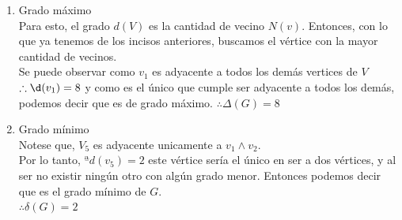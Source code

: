 \documentclass{article}
\begin{document}
\begin{justify}
{\begin{enumerate}
      \item Grado máximo \\
        Para esto, el grado $d(V) $ es la cantidad de vecino $N(v)$. Entonces, con lo que ya tenemos de los incisos anteriores, buscamos el vértice con la mayor cantidad de vecinos.\\
        Se puede observar como $v_1$ es adyacente a todos los demás vertices de $V$\\
        $\therefore  \d(v_1) = 8$ y como es el único que cumple ser adyacente a todos los demás, podemos decir que es de grado máximo.
        $\therefore \Delta(G) = 8$
      \item Grado mínimo \\
        Notese que, $V_5$ es adyacente unicamente a $v_1 \land v_2 $. \\
        Por lo tanto, $ªd(v_5) = 2$ este vértice sería el único en ser a dos vértices, y al ser no existir ningún otro con algún grado menor.
        Entonces podemos decir que es el grado mínimo de $G$.\\
        $\therefore \delta(G) = 2$
      \end{enumerate}
      }
\end{justify}
\end{document}
